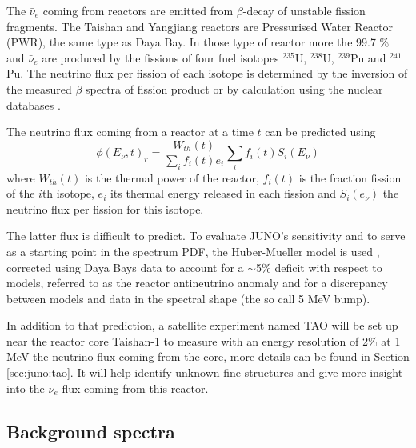 \documentclass[../main.tex]{subfiles}
\begin{document}
The $\bar{\nu}_e$ coming from reactors are emitted from $\beta$-decay of unstable fission fragments. The Taishan and Yangjiang reactors are Pressurised Water Reactor (PWR), the same type as Daya Bay. In those type of reactor more the 99.7 \% and $\bar{\nu}_e$ are produced by the fissions of four fuel isotopes $^{235}$U, $^{238}$U, $^{239}$Pu and $^{241}$Pu. The neutrino flux per fission of each isotope is determined by the inversion of the measured $\beta$ spectra of fission product \cite{hahn_antineutrino_1989, mueller_improved_2011, von_feilitzsch_experimental_1982, schreckenbach_determination_1985, huber_determination_2011} or by calculation using the nuclear databases \cite{vogel_reactor_1981, dwyer_spectral_2015}.

The neutrino flux coming from a reactor at a time $t$ can be predicted using
\begin{equation}
  \phi(E_\nu, t)_r = \frac{W_{th}(t)}{\sum_i f_i(t) e_i} \sum_i f_i(t) S_i(E_\nu)
\end{equation}
where $W_{th}(t)$ is the thermal power of the reactor, $f_i(t)$ is the fraction fission of the $i$th isotope, $e_i$ its thermal energy released in each fission and $S_i(e_\nu)$ the neutrino flux per fission for this isotope.

The latter flux is difficult to predict. To evaluate JUNO's sensitivity and to serve as a starting point in the spectrum PDF, the Huber-Mueller model is used \cite{mueller_improved_2011}, corrected
using Daya Bays data \cite{daya_bay_collaboration_measurement_2016} to account for a $\sim$5\% deficit with respect to models, referred to as the reactor antineutrino anomaly \cite{mention_reactor_2011} and for a discrepancy between models and data in the spectral shape (the so call 5 MeV bump).

In addition to that prediction, a satellite experiment named TAO\cite{juno_collaboration_tao_2020} will be set up near the reactor core Taishan-1 to measure with an energy resolution of 2\% at 1 MeV the neutrino flux coming from the core, more details can be found in Section \ref{sec:juno:tao}. It will help identify unknown fine structures and give more insight into the $\bar{\nu}_e$ flux coming from this reactor.

\subsection{Background spectra}
\end{document}
